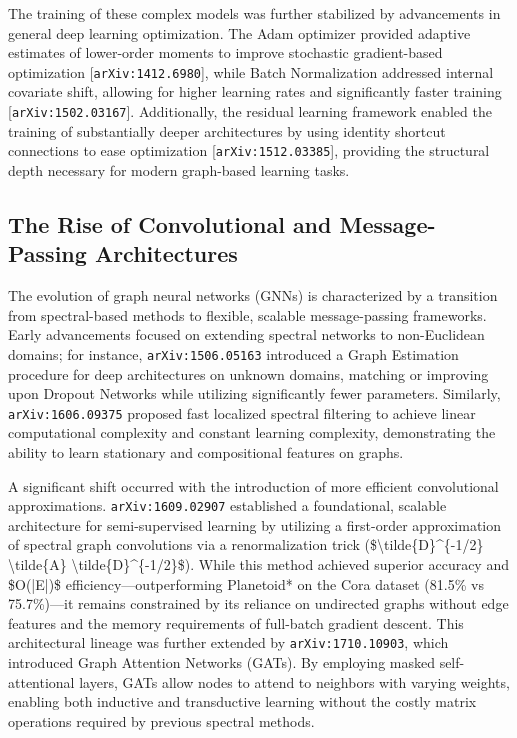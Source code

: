 \documentclass[11pt]{article}
\begin{document}
The training of these complex models was further stabilized by advancements in general deep learning optimization. The Adam optimizer provided adaptive estimates of lower-order moments to improve stochastic gradient-based optimization [\texttt{arXiv:1412.6980}], while Batch Normalization addressed internal covariate shift, allowing for higher learning rates and significantly faster training [\texttt{arXiv:1502.03167}]. Additionally, the residual learning framework enabled the training of substantially deeper architectures by using identity shortcut connections to ease optimization [\texttt{arXiv:1512.03385}], providing the structural depth necessary for modern graph-based learning tasks.

\subsection{The Rise of Convolutional and Message-Passing Architectures}

The evolution of graph neural networks (GNNs) is characterized by a transition from spectral-based methods to flexible, scalable message-passing frameworks. Early advancements focused on extending spectral networks to non-Euclidean domains; for instance, \texttt{arXiv:1506.05163} introduced a Graph Estimation procedure for deep architectures on unknown domains, matching or improving upon Dropout Networks while utilizing significantly fewer parameters. Similarly, \texttt{arXiv:1606.09375} proposed fast localized spectral filtering to achieve linear computational complexity and constant learning complexity, demonstrating the ability to learn stationary and compositional features on graphs.

A significant shift occurred with the introduction of more efficient convolutional approximations. \texttt{arXiv:1609.02907} established a foundational, scalable architecture for semi-supervised learning by utilizing a first-order approximation of spectral graph convolutions via a renormalization trick (\$\textbackslash{}tilde\{D\}\textasciicircum{}\{-1/2\} \textbackslash{}tilde\{A\} \textbackslash{}tilde\{D\}\textasciicircum{}\{-1/2\}\$). While this method achieved superior accuracy and \$O(|E|)\$ efficiency—outperforming Planetoid* on the Cora dataset (81.5\% vs 75.7\%)—it remains constrained by its reliance on undirected graphs without edge features and the memory requirements of full-batch gradient descent. This architectural lineage was further extended by \texttt{arXiv:1710.10903}, which introduced Graph Attention Networks (GATs). By employing masked self-attentional layers, GATs allow nodes to attend to neighbors with varying weights, enabling both inductive and transductive learning without the costly matrix operations required by previous spectral methods.
\end{document}
